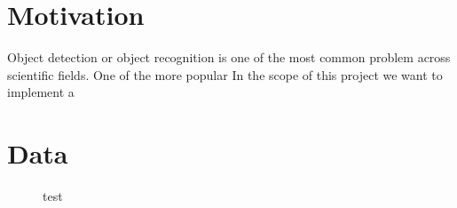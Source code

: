 \newcommand{\feat}{\texttt}







\section{Motivation}
Object detection or object recognition is one of the most common problem across scientific fields. One of the more popular In the scope of this project we want to implement a 


\section{Data}


      \begin{figure}[!htb]
        \caption{\label{fig1} test \cite{whit}}
      \end{figure}